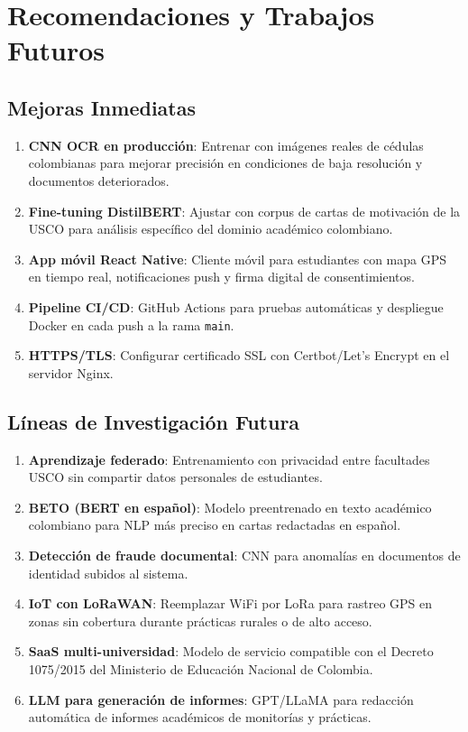 \documentclass[12pt,a4paper,twoside]{report}
\begin{document}
\chapter{Recomendaciones y Trabajos Futuros}

\section{Mejoras Inmediatas}

\begin{enumerate}[leftmargin=*]
\item \textbf{CNN OCR en producción}: Entrenar con imágenes reales de cédulas colombianas para mejorar
precisión en condiciones de baja resolución y documentos deteriorados.
\item \textbf{Fine-tuning DistilBERT}: Ajustar con corpus de cartas de motivación de la USCO para
análisis específico del dominio académico colombiano.
\item \textbf{App móvil React Native}: Cliente móvil para estudiantes con mapa GPS en tiempo real,
notificaciones push y firma digital de consentimientos.
\item \textbf{Pipeline CI/CD}: GitHub Actions para pruebas automáticas y despliegue Docker en cada
push a la rama \texttt{main}.
\item \textbf{HTTPS/TLS}: Configurar certificado SSL con Certbot/Let's Encrypt en el servidor Nginx.
\end{enumerate}

\section{Líneas de Investigación Futura}

\begin{enumerate}[leftmargin=*]
\item \textbf{Aprendizaje federado}: Entrenamiento con privacidad entre facultades USCO sin compartir
datos personales de estudiantes.
\item \textbf{BETO (BERT en español)}: Modelo preentrenado en texto académico colombiano para NLP más
preciso en cartas redactadas en español.
\item \textbf{Detección de fraude documental}: CNN para anomalías en documentos de identidad subidos
al sistema.
\item \textbf{IoT con LoRaWAN}: Reemplazar WiFi por LoRa para rastreo GPS en zonas sin cobertura
durante prácticas rurales o de alto acceso.
\item \textbf{SaaS multi-universidad}: Modelo de servicio compatible con el Decreto 1075/2015 del
Ministerio de Educación Nacional de Colombia.
\item \textbf{LLM para generación de informes}: GPT/LLaMA para redacción automática de informes
académicos de monitorías y prácticas.
\end{enumerate}
\end{document}
